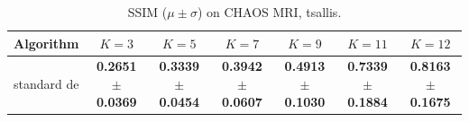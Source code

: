 \begin{table}[htbp]
\centering
\caption{SSIM ($\mu \pm \sigma$) on CHAOS MRI, tsallis.}
\label{tab:exp2-tsallis-ssim}
\begin{tabular}{lcccccc}
\toprule
Algorithm & $K=3$ & $K=5$ & $K=7$ & $K=9$ & $K=11$ & $K=12$ \\
\midrule
standard de & \textbf{0.2651 $\pm$ 0.0369} & \textbf{0.3339 $\pm$ 0.0454} & \textbf{0.3942 $\pm$ 0.0607} & \textbf{0.4913 $\pm$ 0.1030} & \textbf{0.7339 $\pm$ 0.1884} & \textbf{0.8163 $\pm$ 0.1675} \\
\bottomrule
\end{tabular}
\end{table}